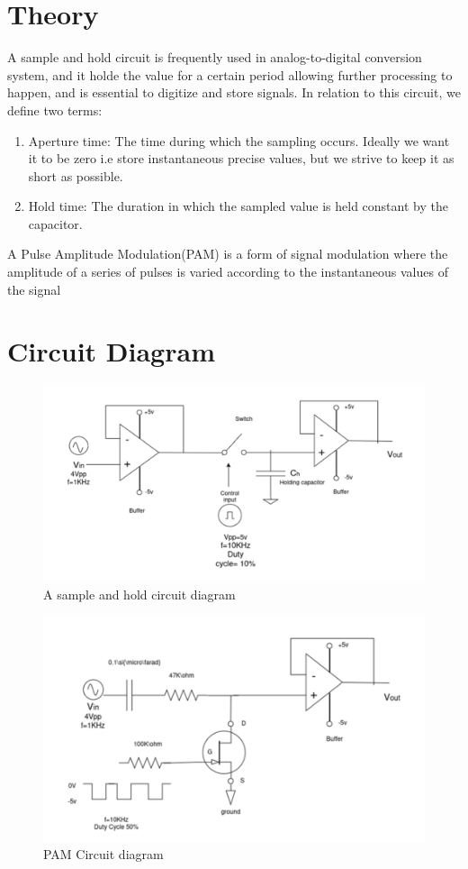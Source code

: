 \documentclass{article}
\begin{document}
\section{Theory}

A sample and hold circuit is frequently used in analog-to-digital conversion system, and it holde the value for a certain period allowing further processing to happen, and is essential to digitize and store signals. In relation to this circuit, we define two terms:
\begin{enumerate}
  \item Aperture time: The time during which the sampling occurs. Ideally we want it to be zero i.e store instantaneous precise values, but we strive to keep it as short as possible.
  \item Hold time: The duration in which the sampled value is held constant by the capacitor. 
\end{enumerate}

A Pulse Amplitude Modulation(PAM) is a form of signal modulation where the amplitude of a series of pulses is varied according to the instantaneous values of the signal
\clearpage
\section{Circuit Diagram}
\begin{figure}[!ht]
\includegraphics[width=\textwidth]{Sample_and_hold.png}
\caption{A sample and hold circuit diagram}
\label{fig:sample_and_hold}
\end{figure}

\begin{figure}[!ht]
\includegraphics[width=\textwidth]{PAM.png}
\caption{PAM Circuit diagram}
\label{fig:PAM}
\end{figure}
\end{document}
